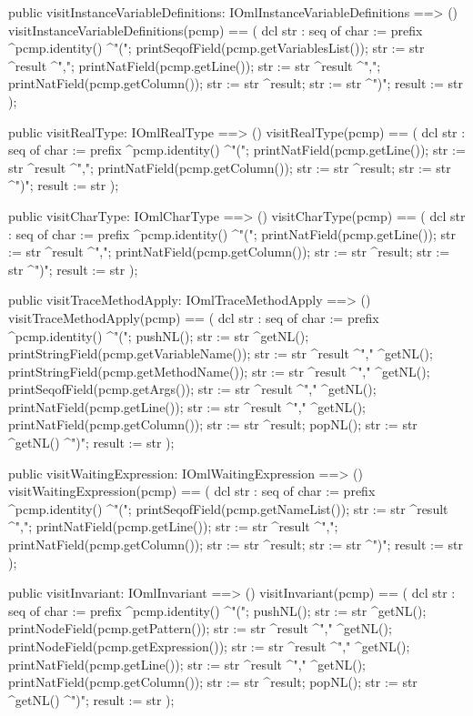 \begin{vdm_al}
  public visitInstanceVariableDefinitions: IOmlInstanceVariableDefinitions ==> ()
  visitInstanceVariableDefinitions(pcmp) ==
    ( dcl str : seq of char := prefix ^pcmp.identity() ^"(";
      printSeqofField(pcmp.getVariablesList());
      str := str ^result ^",";
      printNatField(pcmp.getLine());
      str := str ^result ^",";
      printNatField(pcmp.getColumn());
      str := str ^result;
      str := str ^")";
      result := str );

  public visitRealType: IOmlRealType ==> ()
  visitRealType(pcmp) ==
    ( dcl str : seq of char := prefix ^pcmp.identity() ^"(";
      printNatField(pcmp.getLine());
      str := str ^result ^",";
      printNatField(pcmp.getColumn());
      str := str ^result;
      str := str ^")";
      result := str );

  public visitCharType: IOmlCharType ==> ()
  visitCharType(pcmp) ==
    ( dcl str : seq of char := prefix ^pcmp.identity() ^"(";
      printNatField(pcmp.getLine());
      str := str ^result ^",";
      printNatField(pcmp.getColumn());
      str := str ^result;
      str := str ^")";
      result := str );

  public visitTraceMethodApply: IOmlTraceMethodApply ==> ()
  visitTraceMethodApply(pcmp) ==
    ( dcl str : seq of char := prefix ^pcmp.identity() ^"(";
      pushNL();
      str := str ^getNL();
      printStringField(pcmp.getVariableName());
      str := str ^result ^"," ^getNL();
      printStringField(pcmp.getMethodName());
      str := str ^result ^"," ^getNL();
      printSeqofField(pcmp.getArgs());
      str := str ^result ^"," ^getNL();
      printNatField(pcmp.getLine());
      str := str ^result ^"," ^getNL();
      printNatField(pcmp.getColumn());
      str := str ^result;
      popNL();
      str := str ^getNL() ^")";
      result := str );

  public visitWaitingExpression: IOmlWaitingExpression ==> ()
  visitWaitingExpression(pcmp) ==
    ( dcl str : seq of char := prefix ^pcmp.identity() ^"(";
      printSeqofField(pcmp.getNameList());
      str := str ^result ^",";
      printNatField(pcmp.getLine());
      str := str ^result ^",";
      printNatField(pcmp.getColumn());
      str := str ^result;
      str := str ^")";
      result := str );

  public visitInvariant: IOmlInvariant ==> ()
  visitInvariant(pcmp) ==
    ( dcl str : seq of char := prefix ^pcmp.identity() ^"(";
      pushNL();
      str := str ^getNL();
      printNodeField(pcmp.getPattern());
      str := str ^result ^"," ^getNL();
      printNodeField(pcmp.getExpression());
      str := str ^result ^"," ^getNL();
      printNatField(pcmp.getLine());
      str := str ^result ^"," ^getNL();
      printNatField(pcmp.getColumn());
      str := str ^result;
      popNL();
      str := str ^getNL() ^")";
      result := str );


\end{vdm_al}
